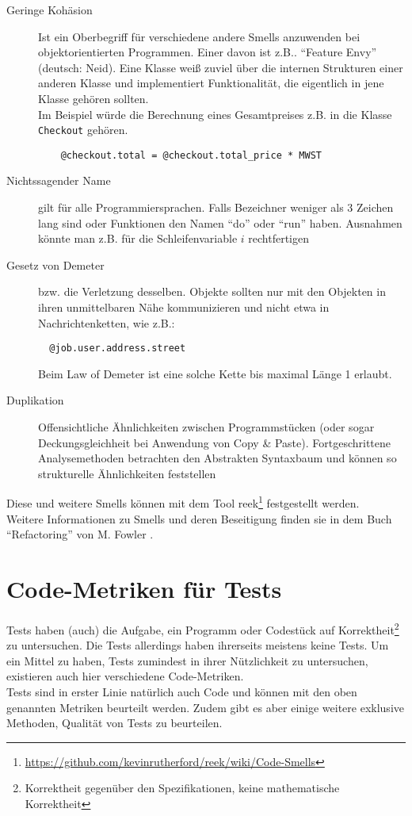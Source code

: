 \begin{description}
 \item[Geringe Kohäsion] Ist ein Oberbegriff für verschiedene andere Smells anzuwenden bei objektorientierten Programmen. Einer davon ist z.B.. "`Feature Envy"' (deutsch: Neid). Eine Klasse weiß zuviel über die internen Strukturen einer anderen Klasse und implementiert Funktionalität, die eigentlich in jene Klasse gehören sollten. \\
 Im Beispiel würde die Berechnung eines Gesamtpreises z.B. in die Klasse \texttt{Checkout} gehören.
 \begin{lstlisting}
    @checkout.total = @checkout.total_price * MWST
 \end{lstlisting}
 \item[Nichtssagender Name] gilt für alle Programmiersprachen. Falls Bezeichner weniger als 3 Zeichen lang sind oder Funktionen den Namen "`do"' oder "`run"' haben. Ausnahmen könnte man z.B. für die Schleifenvariable $i$ rechtfertigen
 \item[Gesetz von Demeter] bzw. die Verletzung desselben. Objekte sollten nur mit den Objekten in ihren unmittelbaren Nähe kommunizieren und nicht etwa in Nachrichtenketten, wie z.B.:
 \begin{lstlisting}
  @job.user.address.street
 \end{lstlisting}
 Beim Law of Demeter ist eine solche Kette bis maximal Länge 1 erlaubt.
 \item[Duplikation] Offensichtliche Ähnlichkeiten zwischen Programmstücken (oder sogar Deckungsgleichheit bei Anwendung von Copy \& Paste). Fortgeschrittene Analysemethoden betrachten den Abstrakten Syntaxbaum und können so strukturelle Ähnlichkeiten feststellen
 \end{description}

Diese und weitere Smells können mit dem Tool reek\footnote{\url{https://github.com/kevinrutherford/reek/wiki/Code-Smells}} festgestellt werden.\\
Weitere Informationen zu Smells und deren Beseitigung finden sie in dem Buch "`Refactoring"' von M. Fowler \citep{fowler_refactoring_1999}.

\section{Code-Metriken für Tests}
\label{sec:metrics}
Tests haben (auch) die Aufgabe, ein Programm oder Codestück auf Korrektheit\footnote{Korrektheit gegenüber den Spezifikationen, keine mathematische Korrektheit} zu untersuchen. Die Tests allerdings haben ihrerseits meistens keine Tests. Um ein Mittel zu haben, Tests zumindest in ihrer Nützlichkeit zu untersuchen, existieren auch hier verschiedene Code-Metriken.\\
Tests sind in erster Linie natürlich auch Code und können mit den oben genannten Metriken beurteilt werden. Zudem gibt es aber einige weitere exklusive Methoden, Qualität von Tests zu beurteilen.

